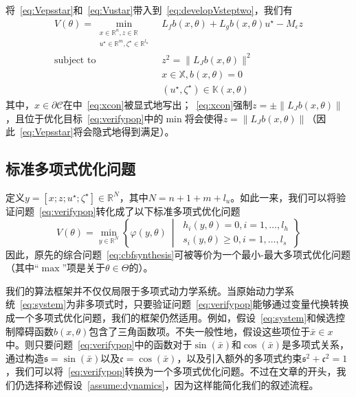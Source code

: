 将~\eqref{eq:Vepsstar}和~\eqref{eq:Vustar}带入到~\eqref{eq:developVsteptwo}，我们有
\begin{align}
    V(\theta) = \min_{\substack{x\in\mathbb{R}^n, z\in\mathbb{R} \\ u^\star\in\mathbb{R}^m, \zeta^\star\in\mathbb{R}^{l_u}}} & L_fb(x,\theta) + L_gb(x,\theta)u^\star - M_\epsilon z \label{eq:verifypop} \\
    \text{subject to } & z^2 = \parallel L_Jb(x,\theta) \parallel^2 \label{eq:zlift} \\
    & x \in \mathbb{X}, b(x, \theta) = 0 \label{eq:xcon} \\
    & (u^\star, \zeta^\star) \in \mathbb{K}(x, \theta)
\end{align}
其中，$x \in \partial \mathcal{C}$在中~\eqref{eq:xcon}被显式地写出；~\eqref{eq:xcon}强制$z = \pm \parallel L_Jb(x, \theta) \parallel$，且位于优化目标~\eqref{eq:verifypop}中的$\min$将会使得$z = \parallel L_Jb(x, \theta) \parallel$（因此~\eqref{eq:Vepsstar}将会隐式地得到满足）。

\subsection{标准多项式优化问题}
定义$y = \left[ x; z; u^\star; \zeta^\star \right] \in \mathbb{R}^N$，其中$N = n + 1 + m + l_u$。如此一来，我们可以将验证问题~\eqref{eq:verifypop}转化成了以下标准多项式优化问题
\begin{equation}\label{eq:standardpop}
    V(\theta) = \min_{y \in \mathbb{R}^N} \left\{ 
        \varphi(y, \theta) \ \middle\vert \ \begin{array}{c}
            h_i(y, \theta) = 0, i = 1,\dots, l_h \\
            s_i(y, \theta) \ge 0, i = 1, \dots, l_s
        \end{array}
     \right\}
\end{equation}
因此，原先的综合问题~\eqref{eq:cbfsynthesis}可被等价为一个最小-最大多项式优化问题（其中“$\max$”项是关于$\theta \in \Theta$的）。

\begin{remark}[非多项式动力学系统]
    我们的算法框架并不仅仅局限于多项式动力学系统。当原始动力学系统~\eqref{eq:system}为非多项式时，只要验证问题~\eqref{eq:verifypop}能够通过变量代换转换成一个多项式优化问题，我们的框架仍然适用。例如，假设~\eqref{eq:system}和候选控制障碍函数$b(x, \theta)$包含了三角函数项。不失一般性地，假设这些项位于$\bar{x} \in x$中。则只要问题~\eqref{eq:verifypop}中的函数对于$\sin(\bar{x})$和$\cos(\bar{x})$是多项式关系，通过构造$\mathfrak{s} = \sin(\bar{x})$以及$\mathfrak{c} = \cos(\bar{x})$，以及引入额外的多项式约束$\mathfrak{s}^2 + \mathfrak{c}^2 = 1$，我们可以将~\eqref{eq:verifypop}转换为一个多项式优化问题。不过在文章的开头，我们仍选择称述假设~\ref{assume:dynamics}，因为这样能简化我们的叙述流程。
\end{remark}

